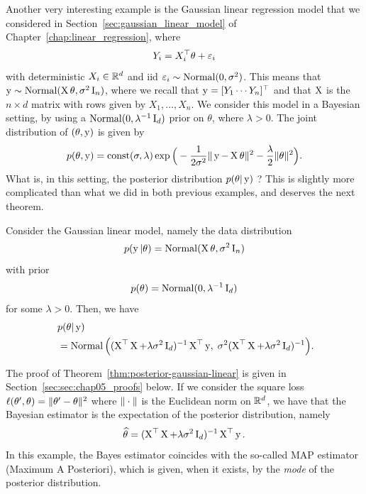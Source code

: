 Another very interesting example is the Gaussian linear regression model that we considered in Section~\ref{sec:gaussian_linear_model} of Chapter~\ref{chap:linear_regression}, where
\begin{equation*}
	Y_i = X_i^\top \theta + \varepsilon_i	
\end{equation*}
with deterministic $X_i \in \mathbb R^d$ and iid $\varepsilon_i \sim \operatorname{Normal}(0, \sigma^2)$.
This means that $\operatorname{{\boldsymbol y}} \sim \operatorname{Normal}(\operatorname{{\boldsymbol X}} \theta, \sigma^2 \operatorname{{\boldsymbol I}}_n)$, where we recall that $\operatorname{{\boldsymbol y}} = [Y_1 \cdots Y_n]^\top$ and that $\operatorname{{\boldsymbol X}}$ is the $n \times d$ matrix with rows given by $X_1, \ldots, X_n$.
We consider this model in a Bayesian setting, by using a $\operatorname{Normal}(0, \lambda^{-1} \operatorname{{\boldsymbol I}}_d)$ prior on $\theta$, where $\lambda > 0$.
The joint distribution of $(\theta, \operatorname{{\boldsymbol y}})$ is given by
\begin{equation*}
	p(\theta, \operatorname{{\boldsymbol y}}) = \text{const}(\sigma, \lambda)
	\exp \Big( -\frac{1}{2 \sigma^2} \| \operatorname{{\boldsymbol y}} - \operatorname{{\boldsymbol X}} \theta \|^2 - \frac {\lambda}{2} \| \theta \|^2 \Big).
\end{equation*}
What is, in this setting, the posterior distribution $p(\theta | \operatorname{{\boldsymbol y}})$ ?
This is slightly more complicated than what we did in both previous examples, and deserves the next theorem.
\begin{theorem}
	\label{thm:posterior-gaussian-linear}
	Consider the Gaussian linear model, namely the data distribution
	\begin{equation*}
		p(\operatorname{{\boldsymbol y}} | \theta) =  \operatorname{Normal}(\operatorname{{\boldsymbol X}} \theta, \sigma^2 \operatorname{{\boldsymbol I}}_n)	
	\end{equation*}
	with prior
	\begin{equation*}
		p(\theta) = \operatorname{Normal}(0, \lambda^{-1} \operatorname{{\boldsymbol I}}_d)
	\end{equation*}
	for some $\lambda > 0$. Then, we have
	\begin{align*}
		&p(\theta | \operatorname{{\boldsymbol y}}) \\
		\; &= \operatorname{Normal} \Big( (\operatorname{{\boldsymbol X}}^\top \operatorname{{\boldsymbol X}}  + \lambda \sigma^2 \operatorname{{\boldsymbol I}}_d)^{-1} \operatorname{{\boldsymbol X}}^\top \operatorname{{\boldsymbol y}}, \;
		\sigma^2 (\operatorname{{\boldsymbol X}}^\top \operatorname{{\boldsymbol X}} + \lambda \sigma^2  \operatorname{{\boldsymbol I}}_d)^{-1} \Big).
	\end{align*}
\end{theorem}
The proof of Theorem~\ref{thm:posterior-gaussian-linear} is given in Section~\ref{sec:sec:chap05_proofs} below.
If we consider the square loss $\ell(\theta', \theta) = \| \theta' - \theta \|^2$ where $\| \cdot \|$ is the Euclidean norm on $\mathbb R^d$, we have that the Bayesian estimator is the expectation%
of the posterior distribution, namely
\begin{equation*}
	\widehat \theta = (\operatorname{{\boldsymbol X}}^\top \operatorname{{\boldsymbol X}}  + \lambda \sigma^2 \operatorname{{\boldsymbol I}}_d)^{-1} \operatorname{{\boldsymbol X}}^\top \operatorname{{\boldsymbol y}}.
\end{equation*}
In this example, the Bayes estimator coincides%
with the so-called MAP estimator (Maximum A Posteriori), which is given, when it exists, by the \emph{mode} of the posterior distribution.

